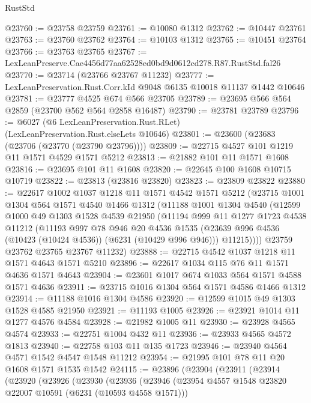 \begin{lexlean}{RustStd}
\begin{coremodule}
{{@23760 := @23758 @23759
@23761 := @10080 @1312
@23762 := @10447 @23761
@23763 := @23760 @23762
@23764 := @10103 @1312
@23765 := @10451 @23764
@23766 := @23763 @23765
@23767 := LexLeanPreserve.Cae4456d77aa62528ed0bd9d0612cd278.R87.RustStd.fal26
@23770 := @23714 (@23766 @23767 @11232)
@23777 := LexLeanPreservation.Rust.Corr.kId @9048 @6135 @10018 @11137 @1442 @10646
@23781 := @23777 @4525 @674 @566 @23705
@23789 := @23695 @566 @564 @2859 (@23700 @562 @564 @2858 @16487)
@23790 := @23781 @23789
@23796 := @6027 (@6 LexLeanPreservation.Rust.RLet) (LexLeanPreservation.Rust.elseLets @10646)
@23801 := @23600 (@23683 (@23706 (@23770 (@23790 @23796))))
@23809 := @22715 @4527 @101 @1219 @11 @1571 @4529 @1571 @5212
@23813 := @21882 @101 @11 @1571 @1608
@23816 := @23695 @101 @11 @1608
@23820 := @22645 @100 @1608 @10715 @10719
@23822 := @23813 (@23816 @23820)
@23823 := @23809 @23822
@23880 := @22617
    @1002
    @1037
    @1218
    @11
    @1571
    @4542
    @1571
    @5212
    (@23715
      @1001
      @1304
      @564
      @1571
      @4540
      @1466
      @1312
      (@11188
        @1001
        @1304
        @4540
        (@12599
          @1000
          @49
          @1303
          @1528
          @4539
          @21950
          (@11194
            @999
            @11
            @1277
            @1723
            @4538
            @11212
            (@11193
              @997
              @78
              @946
              @20
              @4536
              @1535
              (@23639 @996 @4536 (@10423 (@10424 @4536)) (@6231 (@10429 @996 @946)))
              @11215))))
      @23759
      @23762
      @23765
      @23767
      @11232)
@23888 := @22715 @4542 @1037 @1218 @11 @1571 @4643 @1571 @5210
@23896 := @22617 @1034 @115 @76 @11 @1571 @4636 @1571 @4643
@23904 := @23601 @1017 @674 @1033 @564 @1571 @4588 @1571 @4636
@23911 := @23715 @1016 @1304 @564 @1571 @4586 @1466 @1312
@23914 := @11188 @1016 @1304 @4586
@23920 := @12599 @1015 @49 @1303 @1528 @4585 @21950
@23921 := @11193 @1005
@23926 := @23921 @1014 @11 @1277 @4576 @4584
@23928 := @21982 @1005 @11
@23930 := @23928 @4565 @4574
@23933 := @22751 @1004 @432 @11
@23936 := @23933 @4565 @4572 @1813
@23940 := @22758 @103 @11 @135 @1723
@23946 := @23940 @4564 @4571 @1542 @4547 @1548 @11212
@23954 := @21995 @101 @78 @11 @20 @1608 @1571 @1535 @1542
@24115 := @23896
    (@23904
      (@23911
        (@23914
          (@23920
            (@23926
              (@23930
                (@23936
                  (@23946
                    (@23954 @4557 @1548 @23820 @22007 @10591 (@6231 (@10593 @4558 @1571)))
}}
\end{coremodule}
\end{lexlean}
